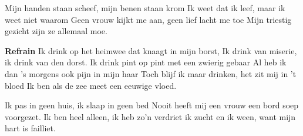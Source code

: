 \footnotemark [
ititle={Ik drink}]


\beginverse
Mijn handen staan scheef, mijn benen staan krom
Ik weet dat ik leef, maar ik weet niet waarom
Geen vrouw kijkt me aan, geen lief lacht me toe
Mijn triestig gezicht zijn ze allemaal moe.
\endverse

\beginchorus
\textbf{Refrain}
Ik drink op het heimwee dat knaagt in mijn borst,
Ik drink van miserie, ik drink van den dorst.
Ik drink pint op pint met een zwierig gebaar
Al heb ik dan 's morgens ook pijn in mijn haar
Toch blijf ik maar drinken, het zit mij in 't bloed
Ik ben als de zee meet een eeuwige vloed.
\endchorus

\beginverse
Ik pas in geen huis, ik slaap in geen bed
Nooit heeft mij een vrouw een bord soep voorgezet.
Ik ben heel alleen, ik heb zo'n verdriet
ik zucht en ik ween, want mijn hart is failliet.
\endverse
\endsong